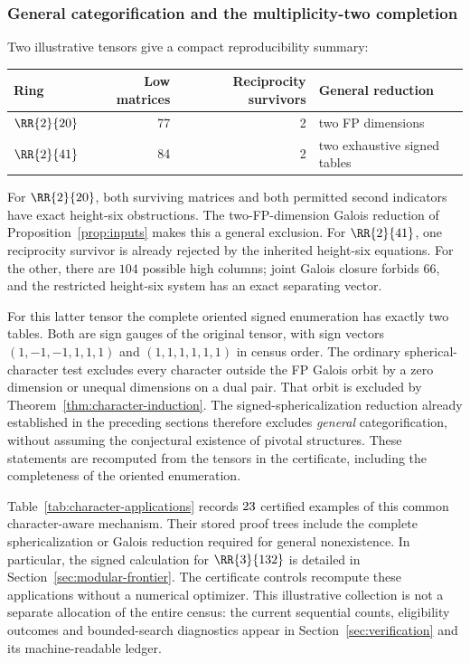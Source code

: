 \subsubsection{General categorification and the multiplicity-two completion}
Two illustrative tensors give a compact reproducibility summary:
\begin{center}
\begin{tabular}{lrrl}\toprule
Ring & Low matrices & Reciprocity survivors & General reduction\\\midrule
$\RR{2}{20}$ & 77 & 2 & two FP dimensions\\
$\RR{2}{41}$ & 84 & 2 & two exhaustive signed tables\\\bottomrule
\end{tabular}
\end{center}
For $\RR{2}{20}$, both surviving matrices and both permitted second
indicators have exact height-six obstructions. The two-FP-dimension
Galois reduction of Proposition~\ref{prop:inputs} makes this a general
exclusion. For $\RR{2}{41}$, one reciprocity survivor is already rejected
by the inherited height-six equations. For the other, there are $104$
possible high columns; joint Galois closure forbids $66$, and the
restricted height-six system has an exact separating vector.

For this latter tensor the complete oriented signed enumeration has
exactly two tables. Both are sign gauges of the original tensor, with
sign vectors $(1,-1,-1,1,1,1)$ and $(1,1,1,1,1,1)$ in census order.
The ordinary spherical-character test excludes every character outside
the FP Galois orbit by a zero dimension or unequal dimensions on a dual
pair. That orbit is excluded by Theorem~\ref{thm:character-induction}.
The signed-sphericalization reduction already established in the
preceding sections therefore excludes \emph{general} categorification,
without assuming the conjectural existence of pivotal structures.
These statements are recomputed from the tensors in the certificate,
including the completeness of the oriented enumeration.

Table~\ref{tab:character-applications} records $23$ certified examples
of this common character-aware mechanism. Their stored proof trees
include the complete sphericalization or Galois reduction required for
general nonexistence. In particular, the signed calculation for
$\RR{3}{132}$ is detailed in Section~\ref{sec:modular-frontier}.
The certificate controls recompute these applications without a
numerical optimizer. This illustrative collection is not a separate
allocation of the entire census: the current sequential counts,
eligibility outcomes and bounded-search diagnostics appear in
Section~\ref{sec:verification} and its machine-readable ledger.

